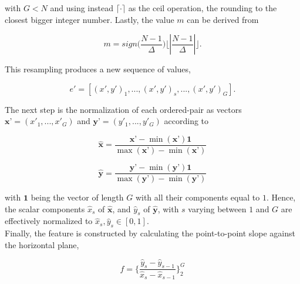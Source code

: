 \noindent with $ G < N $ and using instead $\lceil \cdot \rceil$ as the ceil operation, the rounding to the closest bigger integer number. Lastly, the value $m$ can be derived from

\begin{equation}
m = sign \bigg (  \frac{N-1}{\Delta} \bigg )  \bigg \lfloor \left\lvert \frac{N-1}{\Delta} \right\lvert \bigg \rfloor.
\label{eq:shcc4}
\end{equation}

This resampling produces a new sequence of values,

\begin{equation}
e' = \left[ (x',y')_{1}, ...,(x',y')_{s}, ..., (x',y')_{G} \right].
\label{eq:shcc5}
\end{equation}

The next step is the normalization of each ordered-pair as vectors $\textbf{x'} = (x'_{1},...,x'_{G})$ and $\textbf{y'} = (y'_{1},...,y'_{G})$ according to

\begin{equation}
\hat{\textbf{x}} = \frac{\textbf{x'} - \min(\textbf{x'}) \textbf{1} }{\max(\textbf{x'}) - \min(\textbf{x'})} 
\label{eq:shcc6}
\end{equation}

\begin{equation}
\hat{\textbf{y}} = \frac{ \textbf{y'} - \min(\textbf{y'}) \textbf{1}}{\max(\textbf{y'}) - \min(\textbf{y'})} 
\label{eq:shcc7}
\end{equation}

\noindent with $\textbf{1}$ being the vector of length $G$ with all their components equal to $1$.  Hence, the scalar components $\hat{x}_{s}$ of $\hat{\textbf{x}}$, and $\hat{y}_{s}$ of $\hat{\textbf{y}}$, with $s$ varying between $1$ and $G$ are effectively normalized to $\hat{x}_{s},\hat{y}_{s} \in [0,1]$. \\

Finally, the feature is constructed by calculating the point-to-point slope against the horizontal plane,

\begin{equation}
f = \bigg \{  \frac{\hat{y}_{s}-\hat{y}_{s-1}}{\hat{x}_{s}-\hat{x}_{s-1}}  \bigg \}_{2}^{G} 
\label{eq:shcc8}
\end{equation}


